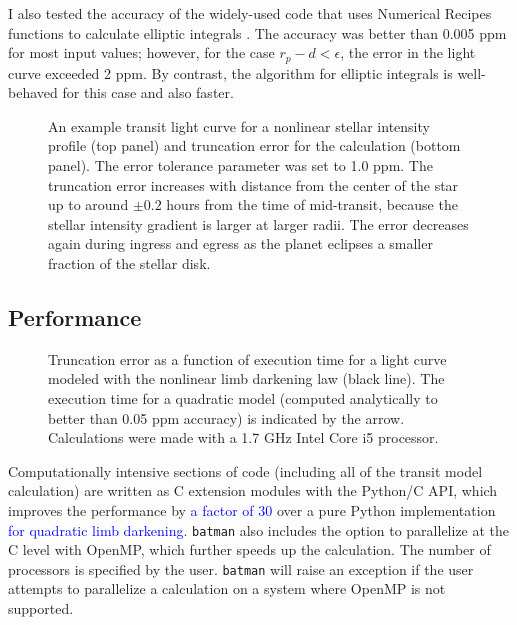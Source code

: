 \documentclass[12pt,preprint]{aastex}
\newcommand*{\blue}{\textcolor{blue}}
\begin{document}
I also tested the accuracy of the widely-used \cite{mandel02} code that uses Numerical Recipes functions to calculate elliptic integrals \citep{press92}.  The accuracy was better than 0.005 ppm for most input values; however, for the case $r_p - d < \epsilon$, the error in the light curve exceeded 2 ppm. By contrast, the \cite{bulirsch65} algorithm for elliptic integrals is well-behaved for this case and also faster.

\begin{figure}
\caption{An example transit light curve for a nonlinear stellar intensity profile (top panel) and truncation error for the calculation (bottom panel).  The error tolerance parameter was set to 1.0 ppm.  The truncation error increases with distance from the center of the star up to around $\pm0.2$ hours from the time of mid-transit, because the stellar intensity gradient is larger at larger radii. The error decreases again during ingress and egress as the planet eclipses a smaller fraction of the stellar disk.}
\label{fig:transit}
\end{figure}


\subsection{Performance}
\begin{figure}
\caption{Truncation error as a function of execution time for a light curve modeled with the nonlinear limb darkening law (black line). The execution time for a quadratic model (computed analytically to better than 0.05 ppm accuracy) is indicated by the arrow. Calculations were made with a 1.7 GHz Intel Core i5 processor.} 
\label{fig:performance}
\end{figure}

Computationally intensive sections of code (including all of the transit model calculation) are written as C extension modules with the Python/C API, which improves the performance by \blue{a factor of 30} over a pure Python implementation \blue{for quadratic limb darkening}.  \texttt{batman} also includes the option to parallelize at the C level with OpenMP, which further speeds up the calculation. The number of processors is specified by the user.  \texttt{batman} will raise an exception if the user attempts to parallelize a calculation on a system where OpenMP is not supported.
\end{document}
